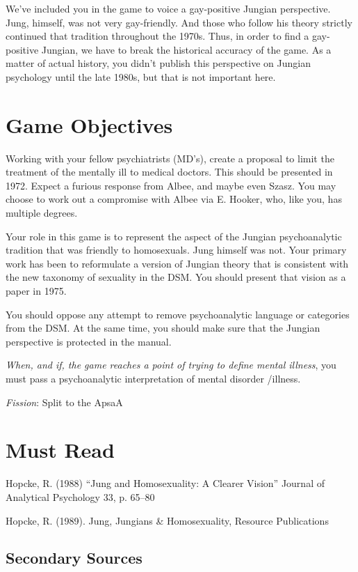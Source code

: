 \begin{refsection}
We've included you in the game to voice a gay-positive Jungian perspective. Jung, himself, was not very gay-friendly. And those who follow his theory strictly continued that tradition throughout the 1970s. Thus, in order to find a gay-positive Jungian, we have to break the historical accuracy of the game. As a matter of actual history, you didn't publish this perspective on Jungian psychology until the late 1980s, but that is not important here.

\section{Game Objectives}
\label{gameobjectives}

Working with your fellow psychiatrists (MD's), create a proposal to limit the treatment of the mentally ill to medical doctors. This should be presented in 1972. Expect a furious response from Albee, and maybe even Szasz. You may choose to work out a compromise with Albee via E. Hooker, who, like you, has multiple degrees.

Your role in this game is to represent the aspect of the Jungian psychoanalytic tradition that was friendly to homosexuals. Jung himself was not. Your primary work has been to reformulate a version of Jungian theory that is consistent with the new taxonomy of sexuality in the DSM. You should present that vision as a paper in 1975.

You should oppose any attempt to remove psychoanalytic language or categories from the DSM. At the same time, you should make sure that the Jungian perspective is protected in the manual.

\emph{When, and if, the game reaches a point of trying to define mental illness}, you must pass a psychoanalytic interpretation of mental disorder \slash  illness.

\emph{Fission}: Split to the ApsaA

\section{Must Read}
\label{mustread}

Hopcke, R. (1988) ``Jung and Homosexuality: A Clearer Vision'' Journal of Analytical Psychology 33, p. 65--80

Hopcke, R. (1989). Jung, Jungians \& Homosexuality, Resource Publications

\subsection{Secondary Sources}
\label{secondarysources}


\end{refsection}

